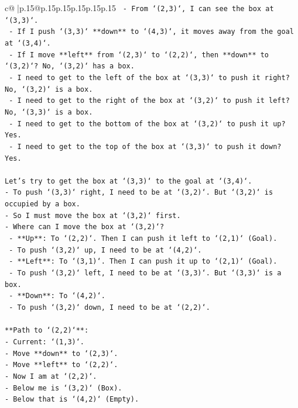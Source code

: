 \documentclass{article}
\begin{document}
{\begin{supertabular}{c@{$\;$}|p{.15\linewidth}@{}p{.15\linewidth}p{.15\linewidth}p{.15\linewidth}p{.15\linewidth}p{.15\linewidth}}
{{{\texttt{  {-} From `(2,3)`, I can see the box at `(3,3)`.} \\
\texttt{  {-} If I push `(3,3)` **down** to `(4,3)`, it moves away from the goal at `(3,4)`.} \\
\texttt{  {-} If I move **left** from `(2,3)` to `(2,2)`, then **down** to `(3,2)`? No, `(3,2)` has a box.} \\
\texttt{  {-} I need to get to the left of the box at `(3,3)` to push it right? No, `(3,2)` is a box.} \\
\texttt{  {-} I need to get to the right of the box at `(3,2)` to push it left? No, `(3,3)` is a box.} \\
\texttt{  {-} I need to get to the bottom of the box at `(3,2)` to push it up? Yes.} \\
\texttt{  {-} I need to get to the top of the box at `(3,3)` to push it down? Yes.} \\
\\ 
\texttt{Let's try to get the box at `(3,3)` to the goal at `(3,4)`.} \\
\texttt{{-} To push `(3,3)` right, I need to be at `(3,2)`. But `(3,2)` is occupied by a box.} \\
\texttt{{-} So I must move the box at `(3,2)` first.} \\
\texttt{{-} Where can I move the box at `(3,2)`?} \\
\texttt{  {-} **Up**: To `(2,2)`. Then I can push it left to `(2,1)` (Goal).} \\
\texttt{    {-} To push `(3,2)` up, I need to be at `(4,2)`.} \\
\texttt{  {-} **Left**: To `(3,1)`. Then I can push it up to `(2,1)` (Goal).} \\
\texttt{    {-} To push `(3,2)` left, I need to be at `(3,3)`. But `(3,3)` is a box.} \\
\texttt{  {-} **Down**: To `(4,2)`.} \\
\texttt{    {-} To push `(3,2)` down, I need to be at `(2,2)`.} \\
\\ 
\texttt{**Path to `(2,2)`**:} \\
\texttt{{-} Current: `(1,3)`.} \\
\texttt{{-} Move **down** to `(2,3)`.} \\
\texttt{{-} Move **left** to `(2,2)`.} \\
\texttt{{-} Now I am at `(2,2)`.} \\
\texttt{{-} Below me is `(3,2)` (Box).} \\
\texttt{{-} Below that is `(4,2)` (Empty).} \\
}}}
\end{supertabular}}
\end{document}
